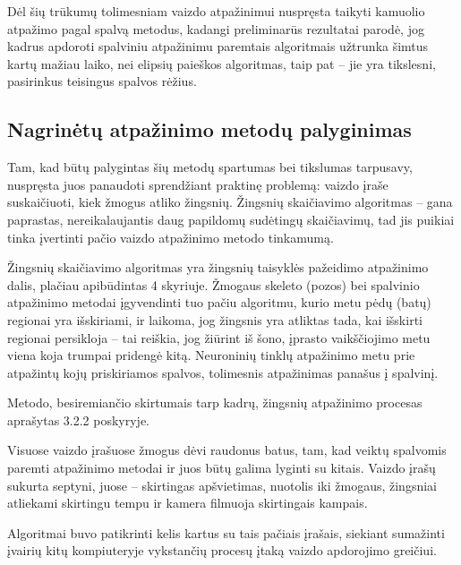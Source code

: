 \documentclass{VUMIFPSbakalaurinis}
\begin{document}
Dėl šių trūkumų tolimesniam vaizdo atpažinimui nuspręsta taikyti kamuolio atpažimo pagal spalvą metodus, kadangi preliminarūs rezultatai parodė, jog kadrus apdoroti spalviniu atpažinimu paremtais algoritmais užtrunka šimtus kartų mažiau laiko, nei elipsių paieškos algoritmas, taip pat – jie yra tikslesni, pasirinkus teisingus spalvos rėžius. 

\subsection{Nagrinėtų atpažinimo metodų palyginimas}

Tam, kad būtų palygintas šių metodų spartumas bei tikslumas tarpusavy, nuspręsta juos panaudoti sprendžiant praktinę problemą: vaizdo įraše suskaičiuoti, kiek žmogus atliko žingsnių. Žingsnių skaičiavimo algoritmas – gana paprastas, nereikalaujantis daug papildomų sudėtingų skaičiavimų, tad jis puikiai tinka įvertinti pačio vaizdo atpažinimo metodo tinkamumą.  

Žingsnių skaičiavimo algoritmas yra žingsnių taisyklės pažeidimo atpažinimo dalis, plačiau apibūdintas 4 skyriuje. Žmogaus skeleto (pozos) bei spalvinio atpažinimo metodai įgyvendinti tuo pačiu algoritmu, kurio metu pėdų (batų) regionai yra išskiriami, ir laikoma, jog žingsnis yra atliktas tada, kai išskirti regionai persikloja – tai reiškia, jog žiūrint iš šono, įprasto vaikščiojimo metu viena koja trumpai pridengė kitą. Neuroninių tinklų atpažinimo metu prie atpažintų kojų priskiriamos spalvos, tolimesnis atpažinimas panašus į spalvinį.

Metodo, besiremiančio skirtumais tarp kadrų, žingsnių atpažinimo procesas aprašytas 3.2.2 poskyryje.

Visuose vaizdo įrašuose žmogus dėvi raudonus batus, tam, kad veiktų spalvomis paremti atpažinimo metodai ir juos būtų galima lyginti su kitais. Vaizdo įrašų sukurta septyni, juose – skirtingas apšvietimas, nuotolis iki žmogaus, žingsniai atliekami skirtingu tempu ir kamera filmuoja skirtingais kampais. 

Algoritmai buvo patikrinti kelis kartus su tais pačiais įrašais, siekiant sumažinti įvairių kitų kompiuteryje vykstančių procesų įtaką vaizdo apdorojimo greičiui. 
\end{document}

